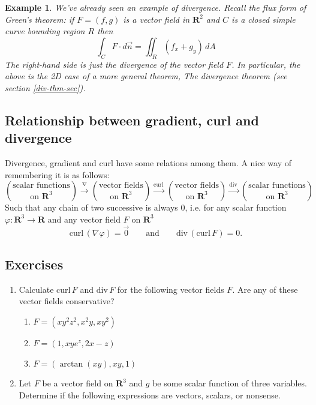 \documentclass[12pt]{article}
\numberwithin{equation}{subsection}
\numberwithin{figure}{subsection}
\theoremstyle{note}
\newtheorem{example}[subsection]{Example}
\newcommand{\curl}{\mathrm{curl\,}}
\newcommand{\dv}{\mathrm{div\,}}
\begin{document}
{\begin{example}
	We've already seen an example of divergence. Recall the flux form of Green's theorem: if $F=(f,g)$ is a vector field in $\mathbf{R}^2$ and $C$ is a closed simple curve bounding region $R$ then \begin{equation} \int_C F\cdot d\vec{n}=\iint_R (f_x+g_y)\,dA\end{equation}
The right-hand side is just the divergence of the vector field $F$. In particular, the above is the 2D case of a more general theorem, \textit{The divergence theorem} (see section \ref{div-thm-sec}).
\end{example}

\subsection{Relationship between gradient, curl and divergence} 

Divergence, gradient and curl have some relations among them. A nice way of remembering it is as follows:
\[ \binom{\text{scalar functions}}{\text{on $\mathbf{R}^3$}} \xrightarrow{\nabla} 
\binom{\text{vector fields}}{\text{on $\mathbf{R}^3$}} \xrightarrow{ \curl} 
\binom{\text{vector fields}}{\text{on $\mathbf{R}^3$}} \xrightarrow{\dv} 
\binom{\text{scalar functions}}{\text{on $\mathbf{R}^3$}}  \]
Such that any chain of two successive is always $0$, i.e. for any scalar function $\varphi\colon\mathbf{R}^3\to \mathbf{R}$ and any vector field $F$ on $\mathbf{R}^3$  \[\curl (\nabla\varphi )=\vec{0} \qquad  \text{and} \qquad \dv (\curl  F)=0.\]



\subsection{Exercises}
\begin{enumerate}[label=\arabic*.]


\item Calculate $\curl F$ and $\dv F$ for the following vector fields $F$. Are any of these vector fields conservative?

\begin{enumerate}
	\item $F=(xy^2z^2, x^2y, xy^2)$
	\item $F=(1, xye^z, 2x-z)$
	\item $F=(\arctan(xy), xy, 1)$
\end{enumerate}

\item Let $F$ be a vector field on $\mathbf{R}^3$ and $g$ be some scalar function of three variables. Determine if the following expressions are vectors, scalars, or nonsense. 


\end{enumerate}}
\end{document}
